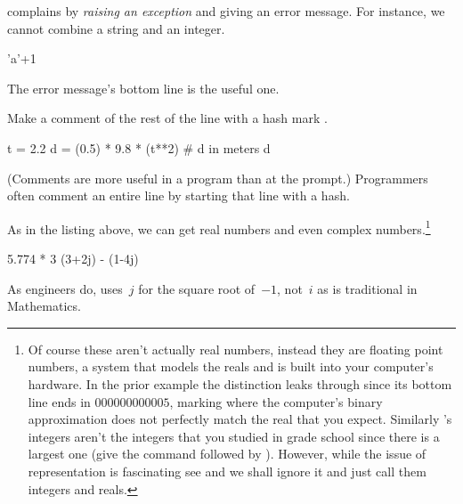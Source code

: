 \python{} complains by \textit{raising an exception} and giving an error 
message.
For instance, we cannot combine a string and an integer. 
\begin{pythonoutput}
'a'+1
\end{pythonoutput}
\noindent The error message's bottom line is the useful one.

Make a comment of the rest of the line with a hash mark \inlinecode{\#}.
\begin{pythonoutput}
t = 2.2
d = (0.5) * 9.8 * (t**2)  # d in meters
d
\end{pythonoutput}
\noindent (Comments are more useful in a program than at the prompt.)
Programmers often comment an entire line by starting 
that line with a hash. 

As in the listing above, we can get real 
numbers 
and even complex numbers.\footnote{Of course these aren't actually 
real numbers, instead they are floating point numbers, a system that
models the reals and is built into your computer's hardware.
In the prior example the distinction leaks through
since its bottom line ends in $000000000005$, marking where
the computer's binary approximation does not perfectly match
the real that you expect.
Similarly \protect\python's integers aren't the integers that you studied
in grade school since there is a largest one (give \python{} the 
command \protect{} followed by 
\protect{}). 
However, while the issue of representation is fascinating\protect\Dash
see \protect\cite{PythonTeam12a} and \protect\cite{Goldberg91}\protect\Dash
we shall ignore it and just call them integers and reals.}
\begin{pythonoutput}
5.774 * 3
(3+2j) - (1-4j)
\end{pythonoutput}
\noindent As engineers do, \python{} uses~$j$ for the square
root of~$-1$, not~$i$ as is traditional in Mathematics.

